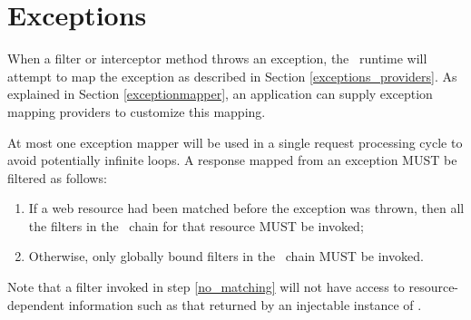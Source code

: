 \section{Exceptions}
\label{exceptions_filters_and_interceptors}

When a filter or interceptor method throws an exception, the \jaxrs\ runtime will attempt to map the exception as described in Section \ref{exceptions_providers}.  As explained in Section \ref{exceptionmapper}, an application can supply exception mapping providers to customize this mapping. 

At most one exception mapper will be used in a single request processing cycle to avoid potentially infinite loops. A response mapped from an exception MUST be filtered as follows:

\begin{enumerate}
\item If a web resource had been matched before the exception was thrown, then all the filters in the \ContainerResponse\ chain for that resource MUST be invoked;
\item\label{no_matching} Otherwise, only globally bound filters in the \ContainerResponse\ chain MUST be invoked. 
\end{enumerate}

Note that a filter invoked in step \ref{no_matching} will not have access to resource-dependent information such as that returned by an injectable instance of .